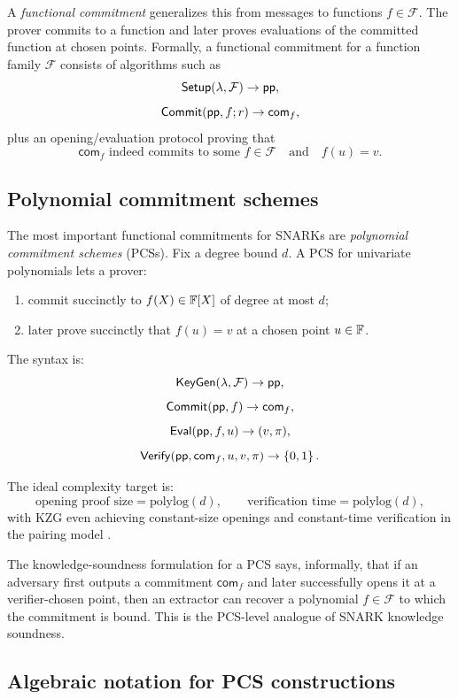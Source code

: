 A \emph{functional commitment} generalizes this from messages to functions $f\in \mathcal{F}$. The prover commits to a function and later proves evaluations of the committed function at chosen points. Formally, a functional commitment for a function family $\mathcal{F}$ consists of algorithms such as
\[
\mathsf{Setup}(\lambda,\mathcal{F})\to \mathsf{pp},
\]
\[
\mathsf{Commit}(\mathsf{pp},f;r)\to \mathsf{com}_f,
\]
plus an opening/evaluation protocol proving that
\[
\mathsf{com}_f \text{ indeed commits to some } f\in \mathcal{F}
\quad\text{and}\quad
f(u)=v.
\]

\subsection{Polynomial commitment schemes}

The most important functional commitments for SNARKs are \emph{polynomial commitment schemes} (PCSs). Fix a degree bound $d$. A PCS for univariate polynomials lets a prover:
\begin{enumerate}[leftmargin=2em]
    \item commit succinctly to $f(X)\in \mathbb{F}[X]$ of degree at most $d$;
    \item later prove succinctly that $f(u)=v$ at a chosen point $u\in\mathbb{F}$.
\end{enumerate}

The syntax is:
\[
\mathsf{KeyGen}(\lambda,\mathcal{F})\to \mathsf{pp},
\]
\[
\mathsf{Commit}(\mathsf{pp},f)\to \mathsf{com}_f,
\]
\[
\mathsf{Eval}(\mathsf{pp},f,u)\to (v,\pi),
\]
\[
\mathsf{Verify}(\mathsf{pp},\mathsf{com}_f,u,v,\pi)\to\left\{0,1\right\}.
\]

The ideal complexity target is:
\[
\text{opening proof size}=\mathrm{polylog}(d),
\qquad
\text{verification time}=\mathrm{polylog}(d),
\]
with KZG even achieving constant-size openings and constant-time verification in the pairing model \cite{KateZaveruchaGoldberg2010}.

The knowledge-soundness formulation for a PCS says, informally, that if an adversary first outputs a commitment $\mathsf{com}_f$ and later successfully opens it at a verifier-chosen point, then an extractor can recover a polynomial $f\in\mathcal{F}$ to which the commitment is bound. This is the PCS-level analogue of SNARK knowledge soundness.

\subsection{Algebraic notation for PCS constructions}

